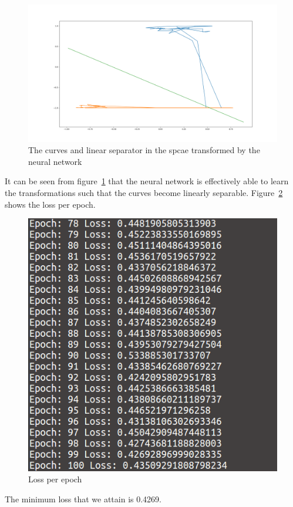 \documentclass[12pt]{report}
\begin{document}
\begin{figure}[H]
	\centering
	\includegraphics[scale = 0.3]{separator}
	\caption{The curves and linear separator in the spcae transformed by the neural network}
	\label{fig:9}
\end{figure}


It can be seen from figure~\ref{fig:9} that the neural network is effectively able to learn the transformations such that the curves become linearly separable. Figure~\ref{fig:10} shows the loss per epoch.

\begin{figure}[H]
	\centering
	\includegraphics[scale=0.5]{que3_loss}
	\caption{Loss per epoch}
	\label{fig:10}
\end{figure}
The minimum loss that we attain is 0.4269.
\end{document}

